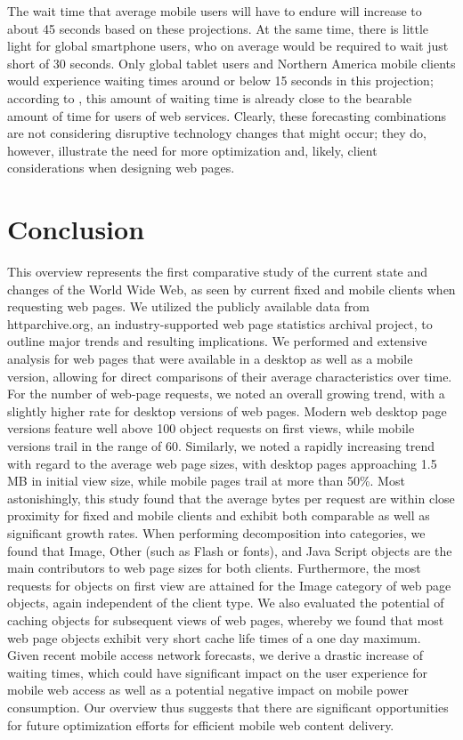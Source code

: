 \documentclass[onecolumn,12pt]{IEEEtran}
\begin{document}
The wait time that average mobile users will have to endure will increase to about 45 seconds based on these projections. 
At the same time, there is little light for global smartphone users, who on average would be required to wait just short of 30 seconds.
Only global tablet users and Northern America mobile clients would experience waiting times around or below 15 seconds in this projection; according to \cite{NiUeNa10}, this amount of waiting time is already close to the bearable amount of time for users of web services.
Clearly, these forecasting combinations are not considering disruptive technology changes that might occur; they do, however, illustrate the need for more optimization and, likely, client considerations when designing web pages.



\section{Conclusion}
\label{s:conc}
This overview represents the first comparative study of the current state and changes of the World Wide Web, as seen by current fixed and mobile clients when requesting web pages.
We utilized the publicly available data from httparchive.org, an industry-supported web page statistics archival project, to outline major trends and resulting implications.
We performed and extensive analysis for web pages that were available in a desktop as well as a mobile version, allowing for direct comparisons of their average characteristics over time.
For the number of web-page requests, we noted an overall growing trend, with a slightly higher rate for desktop versions of web pages. Modern web desktop page versions feature well above 100 object requests on first views, while mobile versions trail in the range of 60.
Similarly, we noted a rapidly increasing trend with regard to the average web page sizes, with desktop pages approaching 1.5 MB in initial view size, while mobile pages trail at more than 50\%.
Most astonishingly, this study found that the average bytes per request are within close proximity for fixed and mobile clients and exhibit both comparable as well as significant growth rates.
When performing decomposition into categories, we found that Image, Other (such as Flash or fonts), and Java Script objects are the main contributors to web page sizes for both clients. Furthermore, the most requests for objects on first view are attained for the Image category of web page objects, again independent of the client type.
We also evaluated the potential of caching objects for subsequent views of web pages, whereby we found that most web page objects exhibit very short cache life times of a one day maximum.
Given recent mobile access network forecasts, we derive a drastic increase of waiting times, which could have significant impact on the user experience for mobile web access as well as a potential negative impact on mobile power consumption.
Our overview thus suggests that there are significant opportunities for future optimization efforts for efficient mobile web content delivery.
\end{document}
